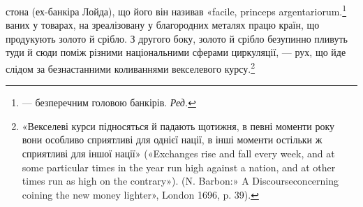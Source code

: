 стона (ех-банкіра Лойда), що його він називав «facile, princeps argentariorum.\footnote*{
— безперечним головою банкірів. \emph{Ред.}
}
ваних у товарах, на зреалізовану у благородних металях працю
країн, що продукують золото й срібло. З другого боку, золото
й срібло безупинно пливуть туди й сюди поміж різними національними
сферами циркуляції, — рух, що йде слідом за безнастанними
коливаннями векселевого курсу.\footnote{
«Векселеві курси підносяться й падають щотижня, в певні моменти
року вони особливо сприятливі для однієї нації, в інші моменти
остільки ж сприятливі для іншої нації» («Exchanges rise and fall every
week, and at some particular times in the year run high against a nation,
and at other times run as high on the contrary»). (N. Barbon:» A Discourseconcerning
coining the new money lighter», London 1696, p. 39).
}

